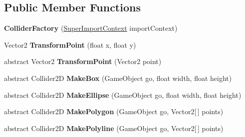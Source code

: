 \subsection*{Public Member Functions}
\begin{DoxyCompactItemize}
\item 
\mbox{\label{class_super_tiled2_unity_1_1_editor_1_1_collider_factory_a12cbf7b68793b6e55fd4b766fc0f1d15}} 
{\bfseries Collider\+Factory} (\mbox{\hyperlink{class_super_tiled2_unity_1_1_editor_1_1_super_import_context}{Super\+Import\+Context}} import\+Context)
\item 
\mbox{\label{class_super_tiled2_unity_1_1_editor_1_1_collider_factory_a2046989335e4f84de25d85a47d6e312c}} 
Vector2 {\bfseries Transform\+Point} (float x, float y)
\item 
\mbox{\label{class_super_tiled2_unity_1_1_editor_1_1_collider_factory_afbb687baadba0aac35a9f9facea14654}} 
abstract Vector2 {\bfseries Transform\+Point} (Vector2 point)
\item 
\mbox{\label{class_super_tiled2_unity_1_1_editor_1_1_collider_factory_a2495218bfc4e8c3fc394cd83313bcf16}} 
abstract Collider2D {\bfseries Make\+Box} (Game\+Object go, float width, float height)
\item 
\mbox{\label{class_super_tiled2_unity_1_1_editor_1_1_collider_factory_a15580e239d749c7cd54037738e804121}} 
abstract Collider2D {\bfseries Make\+Ellipse} (Game\+Object go, float width, float height)
\item 
\mbox{\label{class_super_tiled2_unity_1_1_editor_1_1_collider_factory_a214e07957f8d498c6760635da8ebde5a}} 
abstract Collider2D {\bfseries Make\+Polygon} (Game\+Object go, Vector2\mbox{[}$\,$\mbox{]} points)
\item 
\mbox{\label{class_super_tiled2_unity_1_1_editor_1_1_collider_factory_a787a30fe48e96fa97106d7ce8836a325}} 
abstract Collider2D {\bfseries Make\+Polyline} (Game\+Object go, Vector2\mbox{[}$\,$\mbox{]} points)
\end{DoxyCompactItemize}
